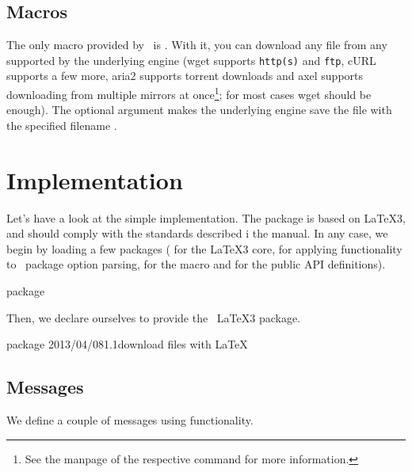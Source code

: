 \documentclass{skdoc}
\begin{document}
    \subsection{Macros}
    \DescribeMacro{}
    The only macro provided by \thepkg\ is . With it, you
    can download any file from any  supported by the underlying
    engine (wget supports \texttt{http(s)} and \texttt{ftp}, cURL
    supports a few more, aria2 supports torrent downloads and axel
    supports downloading from multiple mirrors at once\footnote{See the
    manpage of the respective command for more information.}; for most 
    cases  wget should be enough). The
    optional argument  makes the underlying engine save
    the file with the specified filename .

    \Implementation
    \SelfPreambleTo{\mypreamble}
    \section{Implementation}
    Let's have a look at the simple implementation. The package is based
    on \LaTeX3, and should comply with the standards described i the
     manual. In any case, we begin by loading a few packages
    ( for the \LaTeX3 core,  for applying
     functionality to \LaTeXe\ package option parsing,
     for the  macro and 
    for the public API definitions).
\begin{MacroCode}{package}
\RequirePackage{expl3,l3keys2e,pdftexcmds,xparse}
\end{MacroCode}
    
    Then, we declare ourselves to provide the \thepkg\ \LaTeX3 package.
\begin{MacroCode}{package}
    {2013/04/08}{1.1}{download files with LaTeX}
\end{MacroCode}

    \subsection{Messages}
    We define a couple of messages using  functionality.
\end{document}
